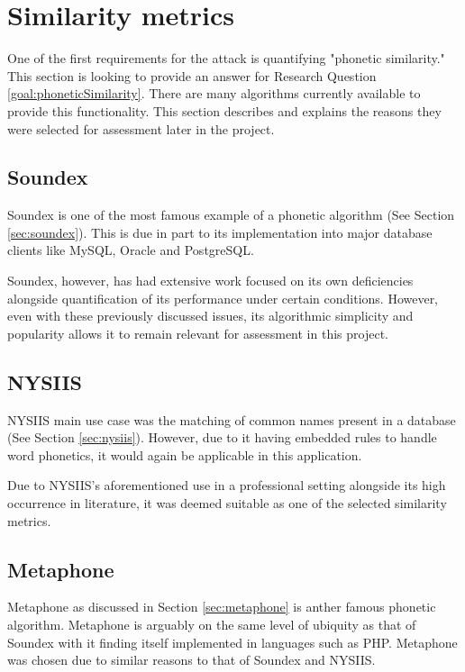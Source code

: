 \section{Similarity metrics}
\label{sec:metrics}
One of the first requirements for the attack is quantifying "phonetic similarity." This section is looking to provide an answer for Research Question \ref{goal:phoneticSimilarity}. There are many algorithms currently available to provide this functionality. This section describes and explains the reasons they were selected for assessment later in the project.

\subsection{Soundex}
Soundex is one of the most famous example of a phonetic algorithm (See Section \ref{sec:soundex}). This is due in part to its implementation into major database clients like MySQL\cite{mysql_soundex}, Oracle\cite{moved_2005} and PostgreSQL\cite{postgresql}.

Soundex, however, has had extensive work focused on its own deficiencies alongside quantification of its performance under certain conditions. However, even with these previously discussed issues, its algorithmic simplicity and popularity allows it to remain relevant for assessment in this project.

\subsection{NYSIIS}
NYSIIS main use case was the matching of common names present in a database (See Section \ref{sec:nysiis}). However, due to it having embedded rules to handle word phonetics, it would again be applicable in this application.

Due to NYSIIS's aforementioned use in a professional setting alongside its high occurrence in literature, it was deemed suitable as one of the selected similarity metrics.

\subsection{Metaphone}
Metaphone as discussed in Section \ref{sec:metaphone} is anther famous phonetic algorithm. Metaphone is arguably on the same level of ubiquity as that of Soundex with it finding itself implemented in languages such as PHP\cite{php}. Metaphone was chosen due to similar reasons to that of Soundex and NYSIIS. 

